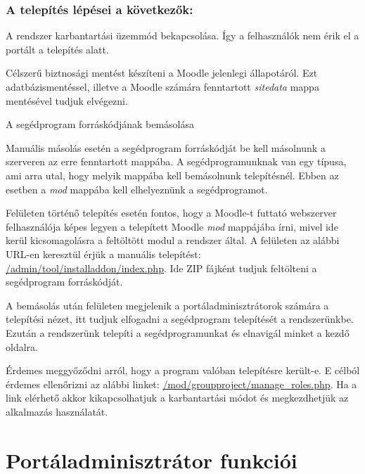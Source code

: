 \subsubsection{\textbf{A telepítés lépései a következők:}}
\begin{compactenum}
	\item A rendszer karbantartási üzemmód bekapcsolása. Így a felhasználók nem érik el a portált a telepítés alatt.
	\item Célszerű biztnosági mentést készíteni a Moodle jelenlegi állapotáról. Ezt adatbázismentéssel, illetve a Moodle számára fenntartott \textit{sitedata} mappa mentésével tudjuk elvégezni.
	\item A segédprogram forráskódjának bemásolása
    \begin{compactitem}
    	\item Manuális másolás esetén a segédprogram forráskódját be kell másolnunk a szerveren az erre fenntartott mappába. A segédprogramunknak van egy típusa, ami arra utal, hogy melyik mappába kell bemásolnunk telepítésnél. Ebben az esetben a \textit{mod} mappába kell elhelyeznünk a segédprogramot.
     \item Felületen történő telepítés esetén fontos, hogy a Moodle-t futtató webszerver felhasználója képes legyen a telepített Moodle \textit{mod} mappájába írni, mivel ide kerül kicsomagolásra a feltöltött modul a rendszer által. A felületen az alábbi URL-en keresztül érjük a manuális telepítést: \url{/admin/tool/installaddon/index.php}. Ide ZIP fájként tudjuk feltölteni a segédprogram forráskódját.
     \end{compactitem}
     \item A bemásolás után felületen megjelenik a portáladminisztrátorok számára a telepítési nézet, itt tudjuk elfogadni a segédprogram telepítését a rendszerünkbe. Ezután a rendszerünk telepíti a segédprogramunkat és elnavigál minket a kezdő oldalra.
     \item Érdemes meggyőződni arról, hogy a program valóban telepítésre került-e. E célból érdemes ellenőrizni az alábbi linket: \url{/mod/groupproject/manage_roles.php}. Ha a link elérhető akkor kikapcsolhatjuk a karbantartási módot és megkezdhetjük az alkalmazás használatát.

\end{compactenum}

\section{Portáladminisztrátor funkciói}

